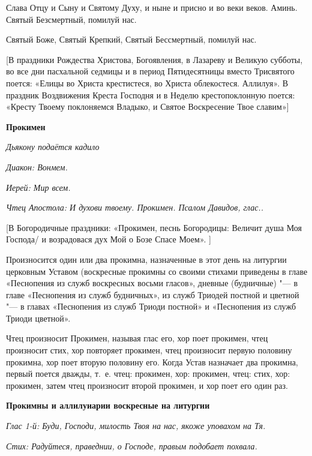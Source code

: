 Слава Отцу и Сыну и Святому Духу, и ныне и присно и во веки веков. Аминь. Святый Безсмертный, помилуй нас.


Святый Боже, Святый Крепкий, Святый Бессмертный, помилуй нас.


[В праздники Рождества Христова, Богоявления, в Лазареву и Великую субботы, во все дни пасхальной седмицы и в период Пятидесятницы вместо Трисвятого поется: «Елицы во Христа крестистеся, во Христа облекостеся. Аллилуя». В праздник Воздвижения Креста Господня и в Неделю крестопоклонную поется: «Кресту Твоему поклоняемся Владыко, и Святое Воскресение Твое славим»]




\medskip\bfseries Прокимен \normalfont{}\nopagebreak


\itshape Дьякону подаётся кадило\normalfont{}


\itshape Диакон:\normalfont{} Вонмем.


\itshape Иерей:\normalfont{} Мир всем.


\itshape Чтец Апостола:\normalfont{} И духови твоему. Прокимен. Псалом Давидов, глас..




[В Богородичные праздники: «Прокимен, песнь Богородицы: Величит душа Моя Господа/ и возрадовася дух Мой о Бозе Спасе Моем». ]


Произносится один или два прокимна, назначенные в этот день на литургии церковным Уставом (воскресные прокимны со своими стихами приведены в главе «Песнопения из служб воскресных восьми гласов», дневные (будничные) "--- в главе «Песнопения из служб будничных», из служб Триодей постной и цветной "--- в главах «Песнопения из служб Триоди постной» и «Песнопения из служб Триоди цветной».


Чтец произносит Прокимен, называя глас его, хор поет прокимен, чтец произносит стих, хор повторяет прокимен, чтец произносит первую половину прокимна, хор поет вторую половину его. Когда Устав назначает два прокимна, первый поется дважды, т.~е. чтец: прокимен, хор: прокимен, чтец: стих, хор: прокимен, затем чтец произносит второй прокимен, и хор поет его один раз.


\medskip\bfseries Прокимны и аллилуиарии воскресные на литургии\normalfont{}\nopagebreak


\itshape Глас 1-й:\normalfont{} Буди, Господи, милость Твоя на нас, якоже уповахом на Тя.


\itshape Стих:\normalfont{} Радуйтеся, праведнии, о Господе, правым подобает похвала.


